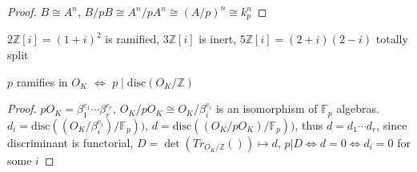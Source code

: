\documentclass[main]{subfiles}
\begin{document}
\begin{proof}
$B\cong A^n$, $B/pB\cong A^n/pA^n\cong(A/p)^n\cong k_p^n$
\end{proof}

\begin{example}
$2\mathbb Z[i]=(1+i)^2$ is ramified, $3\mathbb Z[i]$ is inert, $5\mathbb Z[i]=(2+i)(2-i)$ totally split
\begin{center}
\end{center}
\end{example}

\begin{theorem}
$p$ ramifies in $O_K$ $\Leftrightarrow$ $p\mid\mathrm{disc}(O_K/\mathbb Z)$
\begin{center}
\end{center}
\end{theorem}

\begin{proof}
$pO_K=\beta_1^{e_1}\cdots\beta_r^{e_r}$, $O_K/pO_K\cong O_K/\beta_i^{e_i}$ is an isomorphism of $\mathbb F_p$ algebras. $d_i=\mathrm{disc}((O_K/\beta_i^{e_i})/\mathbb F_p))$, $d=\mathrm{disc}((O_K/pO_K)/\mathbb F_p))$, thus $d=d_1\cdots d_r$, since discriminant is functorial, $D=\det(Tr_{O_K/\mathbb Z}())\mapsto d$, $p|D\Leftrightarrow d=0\Leftrightarrow d_i=0$ for some $i$
\end{proof}
\end{document}
